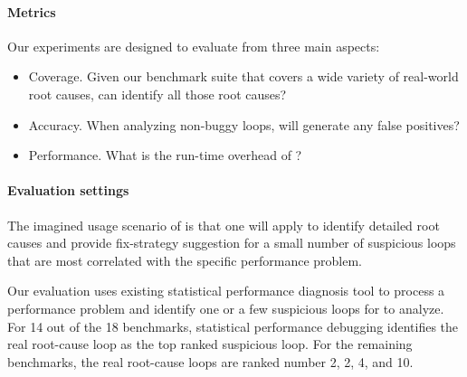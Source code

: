 \paragraph{Metrics}
Our experiments are designed to evaluate \Tool from three main aspects:
\begin{itemize}
\item Coverage. Given our benchmark suite that covers a wide variety
of real-world root causes, can \Tool identify all those root causes?
\vspace{-0.05in}

\item Accuracy. 
When analyzing non-buggy loops, will \Tool generate any false positives?
\vspace{-0.05in}

\item Performance. 
What is the run-time overhead of \Tool?
\end{itemize}

\paragraph{Evaluation settings}
The imagined usage scenario of \Tool is that one will apply \Tool to identify
detailed root causes and provide fix-strategy suggestion for a small number of
suspicious loops that are most correlated with the specific performance problem.

Our evaluation uses existing statistical performance diagnosis
tool \cite{SongOOPSLA2014} to process a performance problem and identify 
one or a few suspicious loops for \Tool to analyze.
For 14 out of the 18 benchmarks, statistical performance debugging identifies the
real root-cause loop as the top ranked suspicious loop. For the remaining
benchmarks, the real root-cause loops are ranked number 2, 2, 4, and 10.

